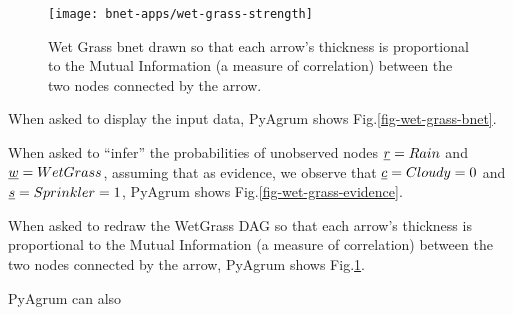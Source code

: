 \begin{figure}[h!]
\centering
\texttt{[image: bnet-apps/wet-grass-strength]}
\caption{Wet Grass bnet drawn so that each arrow's thickness
is proportional to the Mutual Information (a measure of
correlation) between the two nodes connected by the arrow.}
\label{fig-wet-grass-strength}
\end{figure}


When asked to display the input data, PyAgrum shows Fig.\ref{fig-wet-grass-bnet}.



When asked to \enquote{infer} the probabilities of unobserved nodes ${\underline{r}}=Rain$
and ${\underline{w}}=WetGrass$,
assuming that as evidence, we observe that ${\underline{c}}=Cloudy=0$ and ${\underline{s}}=Sprinkler=1$, PyAgrum shows Fig.\ref{fig-wet-grass-evidence}.

When asked to redraw the WetGrass DAG so that each arrow's thickness
is proportional to the Mutual Information (a measure of
correlation) between the two nodes connected by the arrow,
PyAgrum shows Fig.\ref{fig-wet-grass-strength}.


PyAgrum can also  

